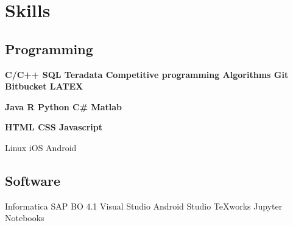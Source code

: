 \documentclass[a4paper]{deedy-resume} %
\begin{document}






\section{Skills}

\subsection{Programming}
\textbf{C/C++ \textbullet{} SQL \textbullet{} Teradata 
\textbullet Competitive programming  \textbullet{}Algorithms 
\textbullet Git \textbullet Bitbucket \textbullet LATEX }

\textbf{Java \textbullet{} R  \textbullet{} Python 
\textbullet C\#  \textbullet{} Matlab  }

\textbf{HTML \textbullet{} CSS \textbullet{} Javascript}

Linux \textbullet{} iOS \textbullet{} Android
\sectionspace
\subsection{Software}
Informatica \textbullet{} SAP BO 4.1 \textbullet{} Visual Studio Android Studio 
\textbullet{} TeXworks \textbullet{} Jupyter Notebooks

\end{document}
